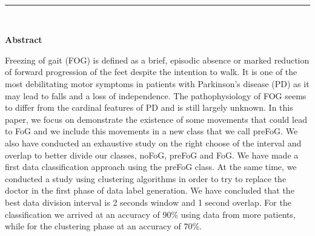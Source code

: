 
\cleardoublepage
\thispagestyle{empty}

\leavevmode \\[0.86cm]
\begin{center}
\rule{\textwidth}{.4pt} \\
\end{center}
{\LARGE\textbf{Abstract}}
\vspace{1cm}

Freezing of gait (FOG) is defined as a brief, episodic absence or marked reduction of forward progression of the feet despite the intention to walk. It is one of the most debilitating motor symptoms in patients with Parkinson's disease (PD) as it may lead to falls and a loss of independence. The pathophysiology of FOG seems to differ from the cardinal features of PD and is still largely unknown. In this paper, we focus on demonstrate the existence of some movements that could lead to FoG and we include this movements in a new class that we call preFoG. We also have conducted an exhaustive study on the right choose of the interval and overlap to better divide our classes, noFoG, preFoG and FoG. We have made a first data classification approach using the preFoG class. At the same time, we conducted a study using clustering algorithms in order to try to replace the doctor in the first phase of data label generation. We have concluded that the best data division interval is 2 seconds window and 1 second overlap. For the classification we arrived at an accuracy of 90\% using data from more patients, while for the clustering phase at an accuracy of 70\%.

\clearpage
\thispagestyle{empty}